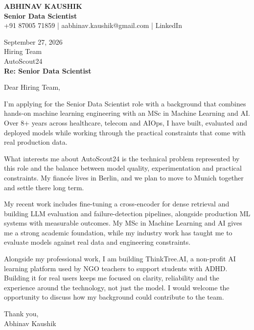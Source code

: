 \documentclass[10pt,a4paper]{article}
\begin{document}
\begin{center}
{\Large\bfseries ABHINAV KAUSHIK}\\[2pt]
{\bfseries Senior Data Scientist}\\[2pt]
+91 87005 71859 \quad | \quad aabhinav.kaushik@gmail.com \quad | \quad LinkedIn
\end{center}
\vspace{8pt}
September 27, 2026\\[6pt]
Hiring Team\\
AutoScout24\\[4pt]
\textbf{Re: Senior Data Scientist}

Dear Hiring Team,

I’m applying for the Senior Data Scientist role with a background that combines hands-on machine learning engineering with an MSc in Machine Learning and AI. Over 8+ years across healthcare, telecom and AIOps, I have built, evaluated and deployed models while working through the practical constraints that come with real production data.

What interests me about AutoScout24 is the technical problem represented by this role and the balance between model quality, experimentation and practical constraints. My fiancée lives in Berlin, and we plan to move to Munich together and settle there long term.

My recent work includes fine-tuning a cross-encoder for dense retrieval and building LLM evaluation and failure-detection pipelines, alongside production ML systems with measurable outcomes. My MSc in Machine Learning and AI gives me a strong academic foundation, while my industry work has taught me to evaluate models against real data and engineering constraints.

Alongside my professional work, I am building ThinkTree.AI, a non-profit AI learning platform used by NGO teachers to support students with ADHD. Building it for real users keeps me focused on clarity, reliability and the experience around the technology, not just the model. I would welcome the opportunity to discuss how my background could contribute to the team.

Thank you,\\
Abhinav Kaushik
\end{document}
